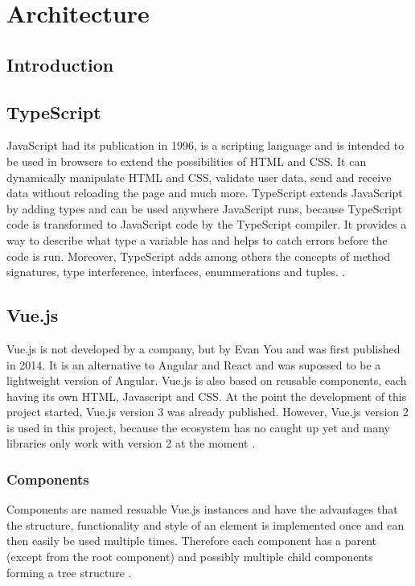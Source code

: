 \chapter{Architecture}

\section{Introduction}

\section{TypeScript}
JavaScript had its publication in 1996, is a scripting language and is intended to be used in browsers to extend the possibilities of HTML and CSS. It can dynamically manipulate HTML and CSS, validate user data, send and receive data without reloading the page and much more.
TypeScript extends JavaScript by adding types and can be used anywhere JavaScript runs, because TypeScript code is transformed to JavaScript code by the TypeScript compiler. It provides a way to describe what type a variable has and helps to catch errors before the code is run. Moreover, TypeScript adds among others the concepts of method signatures, type interference, interfaces, enummerations and tuples. \cite{Typescript}.

\section{Vue.js}
Vue.js is not developed by a company, but by Evan You and was first published in 2014. It is an alternative to Angular and React and was supossed to be a lightweight version of Angular. Vue.js is also based on reusable components, each having its own HTML, Javascript and CSS.
At the point the development of this project started, Vue.js version 3 was already published. However, Vue.js version 2 is used in this project, because the ecosystem has no caught up yet and many libraries only work with version 2 at the moment \cite{Vue}.

\subsection{Components}
Components are named resuable Vue.js instances and have the advantages that the structure, functionality and style of an element is implemented once and can then easily be used multiple times. Therefore each component has a parent (except from the root component) and possibly multiple child components forming a tree structure \cite{Vue}. 

